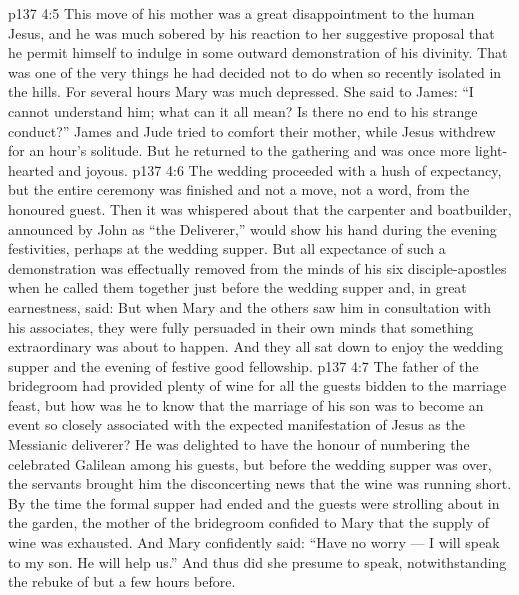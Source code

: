 \vs p137 4:5 This move of his mother was a great disappointment to the human Jesus, and he was much sobered by his reaction to her suggestive proposal that he permit himself to indulge in some outward demonstration of his divinity. That was one of the very things he had decided not to do when so recently isolated in the hills. For several hours Mary was much depressed. She said to James: “I cannot understand him; what can it all mean? Is there no end to his strange conduct?” James and Jude tried to comfort their mother, while Jesus withdrew for an hour’s solitude. But he returned to the gathering and was once more light\hyp{}hearted and joyous.
\vs p137 4:6 \pc The wedding proceeded with a hush of expectancy, but the entire ceremony was finished and not a move, not a word, from the honoured guest. Then it was whispered about that the carpenter and boatbuilder, announced by John as “the Deliverer,” would show his hand during the evening festivities, perhaps at the wedding supper. But all expectance of such a demonstration was effectually removed from the minds of his six disciple\hyp{}apostles when he called them together just before the wedding supper and, in great earnestness, said:  But when Mary and the others saw him in consultation with his associates, they were fully persuaded in their own minds that something extraordinary was about to happen. And they all sat down to enjoy the wedding supper and the evening of festive good fellowship.
\vs p137 4:7 \pc The father of the bridegroom had provided plenty of wine for all the guests bidden to the marriage feast, but how was he to know that the marriage of his son was to become an event so closely associated with the expected manifestation of Jesus as the Messianic deliverer? He was delighted to have the honour of numbering the celebrated Galilean among his guests, but before the wedding supper was over, the servants brought him the disconcerting news that the wine was running short. By the time the formal supper had ended and the guests were strolling about in the garden, the mother of the bridegroom confided to Mary that the supply of wine was exhausted. And Mary confidently said: “Have no worry --- I will speak to my son. He will help us.” And thus did she presume to speak, notwithstanding the rebuke of but a few hours before.
